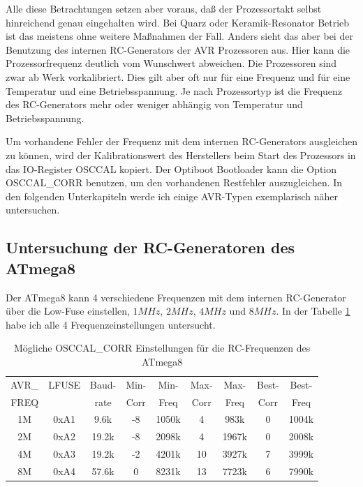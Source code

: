 Alle diese Betrachtungen setzen aber voraus, daß der Prozessortakt selbst hinreichend genau eingehalten wird.
Bei Quarz oder Keramik-Resonator Betrieb ist das meistens ohne weitere Maßnahmen der Fall.
Anders sieht das aber bei der Benutzung des internen RC-Generators der AVR Prozessoren aus.
Hier kann die Prozessorfrequenz deutlich vom Wunschwert abweichen. Die Prozessoren sind zwar ab Werk
vorkalibriert. Dies gilt aber oft nur für eine Frequenz und für eine Temperatur und eine Betriebsspannung.
Je nach Prozessortyp ist die Frequenz des RC-Generators mehr oder weniger abhängig von Temperatur
und Betriebsspannung.

Um vorhandene Fehler der Frequenz mit dem internen RC-Generators ausgleichen zu können,
wird der Kalibrationswert des Herstellers beim Start des Prozessors in das IO-Register OSCCAL kopiert.
Der Optiboot Bootloader kann die Option OSCCAL\_CORR benutzen, um den vorhandenen Restfehler
auszugleichen. In den folgenden Unterkapiteln werde ich einige AVR-Typen exemplarisch näher
untersuchen.

\subsection{Untersuchung der RC-Generatoren des ATmega8}

Der ATmega8 kann 4 verschiedene Frequenzen mit dem internen RC-Generator
über die Low-Fuse einstellen, \(1MHz\), \(2MHz\), \(4MHz\) und \(8MHz\).
In der Tabelle \ref{tab:mega8freq} habe ich alle 4 Frequenzeinstellungen untersucht.

\begin{table}[H]
  \begin{center}
    \begin{tabular}{| c | c | c || c | c || c | c || c | c |}
    \hline
             AVR\_ & LFUSE & Baud- & Min- & Min- & Max- & Max- & Best- & Best-  \\
             FREQ  &       & rate & Corr & Freq & Corr & Freq  & Corr  & Freq  \\
    \hline
    \hline
                1M & 0xA1  &  9.6k &  -8  & 1050k &  4  & 983k  & 0  & 1004k \\
    \hline
                2M & 0xA2  & 19.2k &  -8  & 2098k &  4  & 1967k & 0  & 2008k \\
    \hline
                4M & 0xA3  & 19.2k &  -2  & 4201k & 10  & 3927k & 7  & 3999k \\
    \hline
                8M & 0xA4  & 57.6k &   0  & 8231k & 13  & 7723k & 6  & 7990k \\
    \hline
    \end{tabular}
  \end{center}
  \caption{Mögliche OSCCAL\_CORR Einstellungen für die RC-Frequenzen des ATmega8}
  \label{tab:mega8freq}
\end{table}

